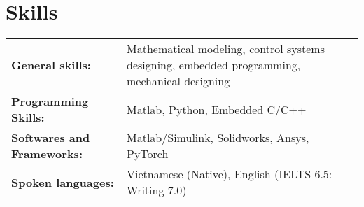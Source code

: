 \documentclass[a4paper,11pt]{article}
\begin{document}
\section{Skills}
\begin{tabularx}{\linewidth}{@{}l X@{}}
\textbf{General skills:} &  \begin{minipage}[t]{\linewidth}
    Mathematical modeling, control systems designing, embedded programming, mechanical designing
\end{minipage}\\
\textbf{Programming Skills:} &  \begin{minipage}[t]{\linewidth}
    Matlab, Python, Embedded C/C++
\end{minipage}\\
\textbf{Softwares and Frameworks:} &  \begin{minipage}[t]{\linewidth}
    Matlab/Simulink, Solidworks, Ansys, PyTorch
\end{minipage}\\
\textbf{Spoken languages:} &  \begin{minipage}[t]{\linewidth}
    Vietnamese (Native), English (IELTS 6.5: Writing 7.0)
\end{minipage}\\
\end{tabularx}



\end{document}
